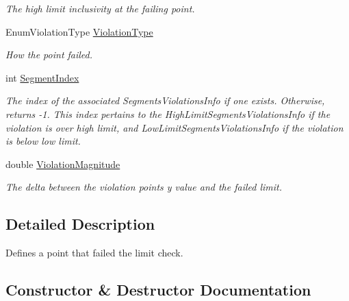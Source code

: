 \begin{DoxyCompactItemize}
\begin{DoxyCompactList}\small\item\em The high limit inclusivity at the failing point. \end{DoxyCompactList}\item 
Enum\+Violation\+Type \mbox{\hyperlink{class_c_s_i_1_1_library_1_1_array_utilities_1_1_array_limit_checks_1_1_violation_a92d66c2b454170a9187bf5504b0da67f}{Violation\+Type}}
\begin{DoxyCompactList}\small\item\em How the point failed. \end{DoxyCompactList}\item 
int \mbox{\hyperlink{class_c_s_i_1_1_library_1_1_array_utilities_1_1_array_limit_checks_1_1_violation_a494a0076c5ab50bc93f973cab04b5890}{Segment\+Index}}
\begin{DoxyCompactList}\small\item\em The index of the associated Segments\+Violations\+Info if one exists. Otherwise, returns -\/1. This index pertains to the High\+Limit\+Segments\+Violations\+Info if the violation is over high limit, and Low\+Limit\+Segments\+Violations\+Info if the violation is below low limit. \end{DoxyCompactList}\item 
double \mbox{\hyperlink{class_c_s_i_1_1_library_1_1_array_utilities_1_1_array_limit_checks_1_1_violation_a19a8e2a0561d5f927877b739aeb9063a}{Violation\+Magnitude}}
\begin{DoxyCompactList}\small\item\em The delta between the violation point\textquotesingle{}s y value and the failed limit. \end{DoxyCompactList}\end{DoxyCompactItemize}


\subsection{Detailed Description}
Defines a point that failed the limit check. 



\subsection{Constructor \& Destructor Documentation}
\mbox{\label{class_c_s_i_1_1_library_1_1_array_utilities_1_1_array_limit_checks_1_1_violation_a8c51ba0cfcbfc757b698ea7681c164e6}} 
